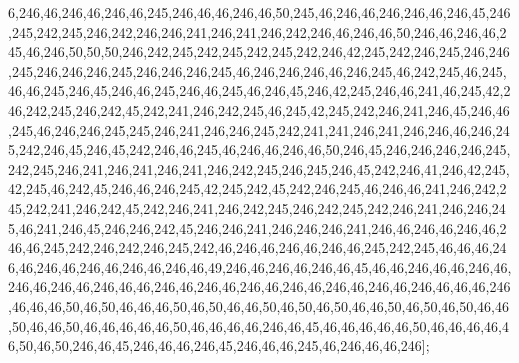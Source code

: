6,246,46,246,46,246,46,245,246,46,46,246,46,50,245,46,246,46,246,246,46,246,45,246,245,242,245,246,242,246,246,241,246,241,246,242,246,46,246,46,50,246,46,246,46,245,46,246,50,50,50,246,242,245,242,245,242,245,242,246,42,245,242,246,245,246,246,245,246,246,246,245,246,246,246,245,46,246,246,246,46,246,245,46,242,245,46,245,46,46,245,246,45,246,46,245,246,46,245,46,246,45,246,42,245,246,46,241,46,245,42,246,242,245,246,242,45,242,241,246,242,245,46,245,42,245,242,246,241,246,45,246,46,245,46,246,246,245,245,246,241,246,246,245,242,241,241,246,241,246,246,46,246,245,242,246,45,246,45,242,246,46,245,46,246,46,246,46,50,246,45,246,246,246,246,245,242,245,246,241,246,241,246,241,246,242,245,246,245,246,45,242,246,41,246,42,245,42,245,46,242,45,246,46,246,245,42,245,242,45,242,246,245,46,246,46,241,246,242,245,242,241,246,242,45,242,246,241,246,242,245,246,242,245,242,246,241,246,246,245,46,241,246,45,246,246,242,45,246,246,241,246,246,246,241,246,46,246,46,246,46,246,46,245,242,246,242,246,245,242,46,246,46,246,46,246,46,245,242,245,46,46,46,246,46,246,46,246,46,246,46,246,46,49,246,46,246,46,246,46,45,46,46,246,46,46,246,46,246,46,246,46,246,46,46,246,46,246,46,246,46,246,46,246,46,246,46,246,46,46,46,246,46,46,46,50,46,50,46,46,46,50,46,50,46,46,50,46,50,46,50,46,46,50,46,50,46,50,46,46,50,46,46,50,46,46,46,46,46,50,46,46,46,46,246,46,45,46,46,46,46,46,50,46,46,46,46,46,50,46,50,246,46,45,246,46,46,246,45,246,46,46,245,46,246,46,46,246];

